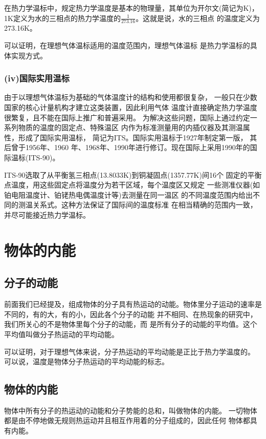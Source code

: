 在热力学温标中，规定热力学温度是基本的物理量，其单位为开尔文(简记为K)，
1K定义为水的三相点的热力学温度的$\frac{1}{273.16}$。这就是说，水的三相点
的温度定义为273.16K。

可以证明，在理想气体温标适用的温度范围内，理想气体温标 
是热力学温标的具体实现方式。

\subsubsection{(iv)国际实用温标}

由于以理想气体温标为基础的气体温度计的结构和使用都很复杂，
一般只在少数国家的核心计量机构才建立这类装置，因此利用气体
温度计直接确定热力学温度很繁复，且不能在国际上推广和普遍采用。
为解决这些问题，国际上通过约定一系列物质的温度的固定点、特殊温区
内作为标准测量用的内插仪器及其测温属性，形成了国际实用温标，
简记为ITS。国际实用温标于1927年制定第一版， 其后曾于1956年、1960
年、1968年、1990年进行修订。现在国际上采用1990年的国际温标(ITS-90)。

ITS-90选取了从平衡氢三相点(13.8033K)到铜凝固点(1357.77K)间16个
固定的平衡点温度，用这些固定点将温度分为若干区域，每个温度区又规定
一些测准仪器(如铂电阻温度计、铂铑热电偶温度计等)去测量在同一温区
的不同温度范围内给出不同的测温关系式。这种方法保证了国际间的温度标准
在相当精确的范围内一致，并尽可能接近热力学温标。

\section{物体的内能}
\subsection{分子的动能}
前面我们已经提及，组成物体的分子具有热运动的动能。物体里分子运动的速率是
不同的，有的大，有的小，因此各个分子的动能
并不相同、在热现象的研究中，我们所关心的不是物体里每个分子的动能，而
是所有分子的动能的平均值。这个平均值叫做分子热运动的平均动能。

可以证明，对于理想气体来说，分子热运动的平均动能是正比于热力学温度的。
可以说，温度是物体分子热运动的平均动能的标志。
\subsection{物体的内能}
\begin{definition}
    物体中所有分子的热运动的动能和分子势能的总和，叫做物体的内能。
    一切物体都是由不停地做无规则热运动并且相互作用着的分子组成的，因此任何
    物体都具有内能。
\end{definition}

